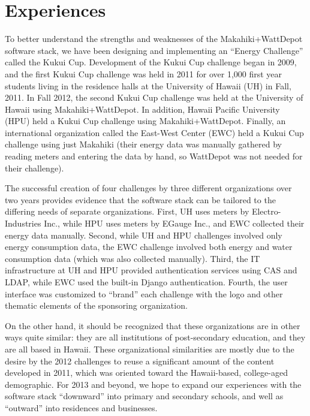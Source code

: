 \section{Experiences}

To better understand the strengths and weaknesses of the Makahiki+WattDepot software stack, we have been designing and implementing an ``Energy Challenge'' called the Kukui Cup.  Development of the Kukui Cup challenge began in 2009, and the first Kukui Cup challenge was held in 2011 for over 1,000 first year students living in the residence halls at the University of Hawaii (UH) in Fall, 2011.  In Fall 2012, the second Kukui Cup challenge was held at the University of Hawaii using Makahiki+WattDepot.  In addition, Hawaii Pacific University (HPU) held a Kukui Cup challenge using Makahiki+WattDepot. Finally, an international organization called the East-West Center (EWC) held a Kukui Cup challenge using just Makahiki (their energy data was manually gathered by reading meters and entering the data by hand, so WattDepot was not needed for their challenge).    

The successful creation of four challenges by three different organizations over two years provides evidence that the software stack can be tailored to the differing needs of separate organizations.  First, UH uses meters by Electro-Industries Inc., while HPU uses meters by EGauge Inc., and EWC collected their energy data manually. Second, while UH and HPU challenges involved only energy consumption data, the EWC challenge involved both energy and water consumption data (which was also collected manually).  Third, the IT infrastructure at UH and HPU provided authentication services using CAS and LDAP, while EWC used the built-in Django authentication. Fourth, the user interface was customized to ``brand'' each challenge with the logo and other thematic elements of the sponsoring organization. 

On the other hand, it should be recognized that these organizations are in other ways quite similar: they are all institutions of post-secondary education, and they are all based in Hawaii.  These organizational similarities are mostly due to the desire by the 2012 challenges to reuse a significant amount of the content developed in 2011, which was oriented toward the Hawaii-based, college-aged demographic. For 2013 and beyond, we hope to expand our experiences with the software stack  ``downward'' into primary and secondary schools, and well as ``outward'' into residences and businesses. 

